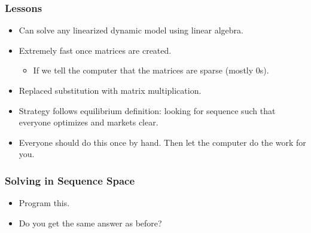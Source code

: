 \documentclass[english,xcolor=svgnames]{beamer}
\begin{document}
	
	
	
	\begin{frame}
		\frametitle{Lessons}
			\begin{itemize}
				\item Can solve any linearized dynamic model using linear algebra.
				\item Extremely fast once matrices are created.
				\begin{itemize}
					\item If we tell the computer that the matrices are sparse (mostly 0s).
				\end{itemize}
				\item Replaced substitution with matrix multiplication.
				\item Strategy follows equilibrium definition: looking for sequence such that everyone optimizes and markets clear. 
				\item Everyone should do this once by hand. Then let the computer do the work for you.
			\end{itemize}
	\end{frame}

	\begin{frame}
		\frametitle{Solving in Sequence Space}
			\begin{itemize}
				\item Program this.
				\item Do you get the same answer as before?
			\end{itemize}
	\end{frame}

\end{document}

